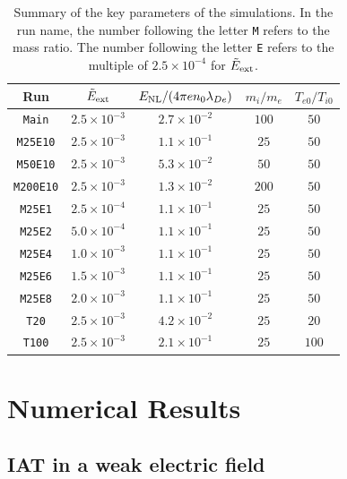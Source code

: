\documentclass[%
 reprint,
 amsmath,
 amssymb,
 aps,
 prx,
floatfix,
superscriptaddress
]{revtex4-2}
\begin{document}
\begin{table}
\renewcommand\arraystretch{1.2}
\caption{\label{tab:sim_summary} Summary of the key parameters of the simulations. In the run name, the number following the letter {\tt M} refers to the mass ratio. The number following the letter {\tt E} refers to the multiple of $2.5\times10^{-4}$ for $\tilde{E}_{\rm ext}$.}
\begin{ruledtabular}
\begin{tabular}{ccccc}
Run & $\tilde{E}_{\rm{ext}}$ & $E_{\rm NL} / (4\pi en_0\lambda_{De})$ & $m_i/m_e$  &  $T_{e0}/T_{i0}$ \\\hline
{\tt Main}   & $2.5\times 10^{-3}$ & $2.7\times 10^{-2}$  & $100$ & $50$    \\
{\tt M25E10}  & $2.5\times 10^{-3}$ & $1.1\times 10^{-1} $  & $25$  & $50$    \\
{\tt M50E10}  & $2.5\times 10^{-3}$ & $5.3 \times 10^{-2}$  & $50$  & $50$    \\
{\tt M200E10} & $2.5\times 10^{-3}$ & $1.3 \times 10^{-2}$  & $200$ & $50$    \\
{\tt M25E1}  & $2.5\times 10^{-4}$ & $1.1 \times 10^{-1}$  & $25$  & $50$    \\
{\tt M25E2}  & $5.0\times 10^{-4}$ & $1.1 \times 10^{-1}$  & $25$  & $50$    \\
{\tt M25E4}  & $1.0\times 10^{-3}$ & $1.1 \times 10^{-1}$  & $25$  & $50$    \\
{\tt M25E6}  & $1.5\times 10^{-3}$ & $1.1 \times 10^{-1}$  & $25$  & $50$    \\
{\tt M25E8}  & $2.0\times 10^{-3}$ & $1.1 \times 10^{-1}$  & $25$  & $50$    \\
{\tt T20}    & $2.5\times 10^{-3}$ & $4.2 \times 10^{-2}$  & $25$  & $20$    \\
{\tt T100}   & $2.5\times 10^{-3}$ & $2.1 \times 10^{-1}$  & $25$  & $100$   \\
\end{tabular}
\end{ruledtabular}
\end{table}


\section{\label{sec:results}Numerical Results}

\subsection{\label{sec:results_1} IAT in a weak electric field}
\end{document}
